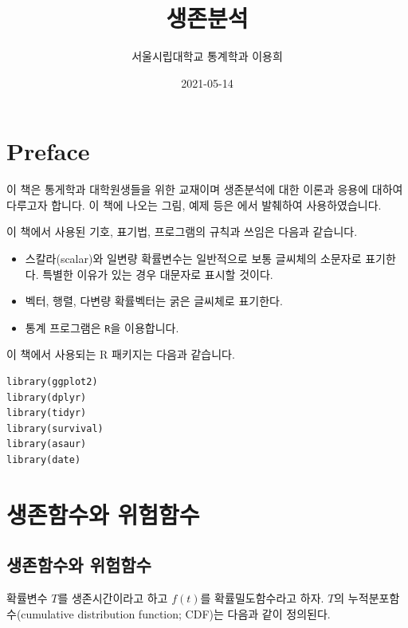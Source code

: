 \documentclass[
]{book}
\title{생존분석}
\author{서울시립대학교 통계학과 이용희}
\date{2021-05-14}
\makeatletter
\providecommand{\tightlist}{%
  \setlength{\itemsep}{0pt}\setlength{\parskip}{0pt}}
\newenvironment{kframe}{%
\medskip{}
\setlength{\fboxsep}{.8em}
 \def\at@end@of@kframe{}%
 \ifinner\ifhmode%
  \def\at@end@of@kframe{\end{minipage}}%
  \begin{minipage}{\columnwidth}%
 \fi\fi%
 \def\FrameCommand##1{\hskip\@totalleftmargin \hskip-\fboxsep
 \colorbox{shadecolor}{##1}\hskip-\fboxsep
     \hskip-\linewidth \hskip-\@totalleftmargin \hskip\columnwidth}%
 \MakeFramed {\advance\hsize-\width
   \@totalleftmargin\z@ \linewidth\hsize
   \@setminipage}}%
 {\par\unskip\endMakeFramed%
 \at@end@of@kframe}
\newenvironment{rmdblock}[1]
  {
  \begin{itemize}
  \renewcommand{\labelitemi}{
    \raisebox{-.7\height}[0pt][0pt]{
      {\setkeys{Gin}{width=3em,keepaspectratio}\texttt{[image: images/\#1]}}
    }
  }
  \setlength{\fboxsep}{1em}
  \begin{kframe}
  \item
  }
  {
  \end{kframe}
  \end{itemize}
  }
\newenvironment{rmdimportant}
  {\begin{rmdblock}{important}}
  {\end{rmdblock}}
\theoremstyle{definition}
\theoremstyle{definition}
\theoremstyle{definition}
\theoremstyle{definition}
\theoremstyle{remark}
\makeatother
\begin{document}
\maketitle

{
\setcounter{tocdepth}{1}
\tableofcontents
}
\hypertarget{preface}{%
\chapter*{Preface}\label{preface}}


이 책은 통게학과 대학원생들을 위한 교재이며 생존분석에 대한 이론과 응용에 대하여 다루고자 합니다.
이 책에 나오는 그림, 예제 등은 \citet{moore2016applied} 에서 발췌하여 사용하였습니다.

\begin{rmdimportant}
이 책에서 사용된 기호, 표기법, 프로그램의 규칙과 쓰임은 다음과 같습니다.

\begin{itemize}
\tightlist
\item
  스칼라(scalar)와 일변량 확률변수는 일반적으로 보통 글씨체의 소문자로 표기한다. 특별한 이유가 있는 경우 대문자로 표시할 것이다.
\item
  벡터, 행렬, 다변량 확률벡터는 굵은 글씨체로 표기한다.
\item
  통계 프로그램은 \texttt{R}을 이용합니다.
\end{itemize}
\end{rmdimportant}

이 책에서 사용되는 R 패키지는 다음과 같습니다.

\begin{verbatim}
library(ggplot2)
library(dplyr)
library(tidyr)
library(survival)
library(asaur)
library(date) 
\end{verbatim}

\mainmatter

\hypertarget{survivalintro}{%
\chapter{생존함수와 위험함수}\label{survivalintro}}

\hypertarget{uxc0dduxc874uxd568uxc218uxc640-uxc704uxd5d8uxd568uxc218}{%
\section{생존함수와 위험함수}\label{uxc0dduxc874uxd568uxc218uxc640-uxc704uxd5d8uxd568uxc218}}

확률변수 \(T\)를 생존시간이라고 하고 \(f(t)\)를 확률밀도함수라고 하자. \(T\)의 누적분포함수(cumulative distribution function; CDF)는 다음과 같이 정의된다.
\end{document}
